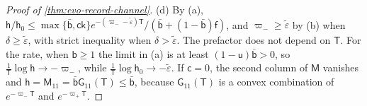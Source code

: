 \begin{proof}[Proof of \cref{thm:evo-record-channel}]
(d) By (a), $\mathsf h/\mathsf h_0\le\max\{\bar{\mathsf b},\mathsf c\mathsf k\}e^{-(\varpi_--\tilde\varepsilon)\mathsf T}/(\bar{\mathsf b}+(1-\bar{\mathsf b})\mathsf f)$, and $\varpi_-\ge\tilde\varepsilon$ by (b) when $\delta\ge\tilde\varepsilon$, with strict inequality when $\delta>\tilde\varepsilon$. The prefactor does not depend on $\mathsf T$. For the rate, when $\mathsf b\ge1$ the limit in (a) is at least $(1-\mathsf u)\bar{\mathsf b}>0$, so $\frac1{\mathsf T}\log\mathsf h\to-\varpi_-$, while $\frac1{\mathsf T}\log\mathsf h_0\to-\tilde\varepsilon$. If $\mathsf c=0$, the second column of $\mathsf M$ vanishes and $\mathsf h=\mathsf M_{11}=\bar{\mathsf b}\mathsf G_{11}(\mathsf T)\le\bar{\mathsf b}$, because $\mathsf G_{11}(\mathsf T)$ is a convex combination of $e^{-\varpi_-\mathsf T}$ and $e^{-\varpi_+\mathsf T}$.


\end{proof}
